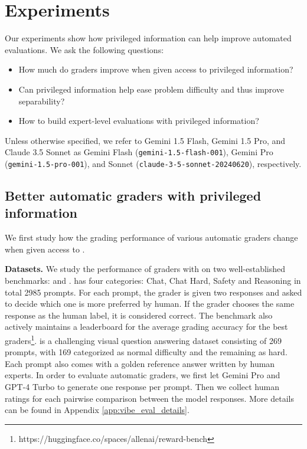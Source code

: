 \section{Experiments}\label{sec:experiments}

Our experiments show how privileged information can help improve automated evaluations. We ask the following questions:
\begin{itemize}
    \item How much do graders improve when given access to privileged information?
    \item Can privileged information help ease problem difficulty and thus improve separability?
    \item How to build expert-level evaluations with privileged information?
\end{itemize}
Unless otherwise specified, we refer to Gemini 1.5 Flash, Gemini 1.5 Pro, and Claude 3.5 Sonnet as Gemini Flash (\texttt{gemini-1.5-flash-001}), Gemini Pro (\texttt{gemini-1.5-pro-001}), and Sonnet (\texttt{claude-3-5-sonnet-20240620}), respectively.

\subsection{Better automatic graders with privileged information}\label{sec:experiments-pi}

We first study how the grading performance of various automatic graders change when given access to \PI.

\textbf{Datasets.} We study the performance of graders with \PI on two well-established benchmarks: \RewardBench \citep{lambert2024rewardbench} and \VibeEval \citep{Padlewski2024-ag}. \RewardBench has four categories: Chat, Chat Hard, Safety and Reasoning in total 2985 prompts. For each prompt, the grader is given two responses and asked to decide which one is more preferred by human. If the grader chooses the same response as the human label, it is considered correct. The benchmark also actively maintains a leaderboard for the average grading accuracy for the best graders\footnote{https://huggingface.co/spaces/allenai/reward-bench}. \VibeEval is a challenging visual question answering dataset consisting of 269 prompts, with 169 categorized as normal difficulty and the remaining as hard. Each prompt also comes with a golden reference answer written by human experts. In order to evaluate automatic graders, we first let Gemini Pro and GPT-4 Turbo to generate one response per prompt. Then we collect human ratings for each pairwise comparison between the model responses. More details can be found in Appendix \ref{app:vibe_eval_details}.

